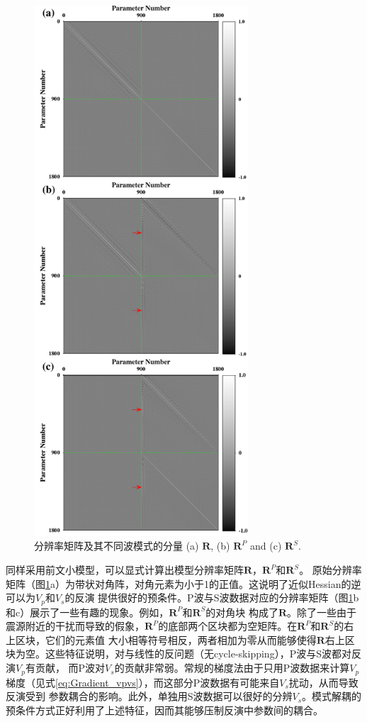 \begin{figure}[!htb]
    \begin{center}
        \includegraphics[width=8cm]{Figure/chapter02/ResoOpera/Fig/resolutionoriginal.pdf}
        \caption{
分辨率矩阵及其不同波模式的分量
(a) $\mathbf{R}$, (b) $\mathbf{R}^P$ and (c) $\mathbf{R}^S$.
    }
    \label{fig:Resolution}
    \end{center}
\end{figure}
同样采用前文小模型，可以显式计算出模型分辨率矩阵$\mathbf{R}$，$\mathbf{R}^P$和$\mathbf{R}^S$。
原始分辨率矩阵（图\ref{fig:Resolution}a）为带状对角阵，对角元素为小于1的正值。这说明了近似Hessian的逆可以为$V_p$和$V_s$的反演
提供很好的预条件。P波与S波数据对应的分辨率矩阵（图\ref{fig:Resolution}b和c）展示了一些有趣的现象。例如，$\mathbf{R}^P$和$\mathbf{R}^S$的对角块
构成了$\mathbf{R}$。除了一些由于震源附近的干扰而导致的假象，$\mathbf{R}^P$的底部两个区块都为空矩阵。在$\mathbf{R}^P$和$\mathbf{R}^S$的右上区块，它们的元素值
大小相等符号相反，两者相加为零从而能够使得$\mathbf{R}$右上区块为空。这些特征说明，对与线性的反问题（无cycle-skipping），P波与S波都对反演$V_p$有贡献，
而P波对$V_s$的贡献非常弱。常规的梯度法由于只用P波数据来计算$V_p$梯度（见式\ref{eq:Gradient_vpvs}），而这部分P波数据有可能来自$V_s$扰动，从而导致反演受到
参数耦合的影响。此外，单独用S波数据可以很好的分辨$V_s$。模式解耦的预条件方式正好利用了上述特征，因而其能够压制反演中参数间的耦合。
